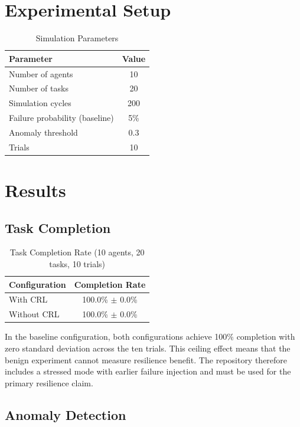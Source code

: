 \documentclass[sigconf]{acmart}
\begin{document}
\section{Experimental Setup}

\begin{table}[h]
\centering
\caption{Simulation Parameters}
\begin{tabular}{lc}
\toprule
Parameter & Value \\
\midrule
Number of agents & 10 \\
Number of tasks & 20 \\
Simulation cycles & 200 \\
Failure probability (baseline) & 5\% \\
Anomaly threshold & 0.3 \\
Trials & 10 \\
\bottomrule
\end{tabular}
\end{table}

\section{Results}

\subsection{Task Completion}

\begin{table}[h]
\centering
\caption{Task Completion Rate (10 agents, 20 tasks, 10 trials)}
\begin{tabular}{lc}
\toprule
Configuration & Completion Rate \\
\midrule
With CRL & 100.0\% $\pm$ 0.0\% \\
Without CRL & 100.0\% $\pm$ 0.0\% \\
\bottomrule
\end{tabular}
\end{table}

In the baseline configuration, both configurations achieve 100\% completion with zero standard deviation across the ten trials. This ceiling effect means that the benign experiment cannot measure resilience benefit. The repository therefore includes a stressed mode with earlier failure injection and must be used for the primary resilience claim.

\subsection{Anomaly Detection}
\end{document}
